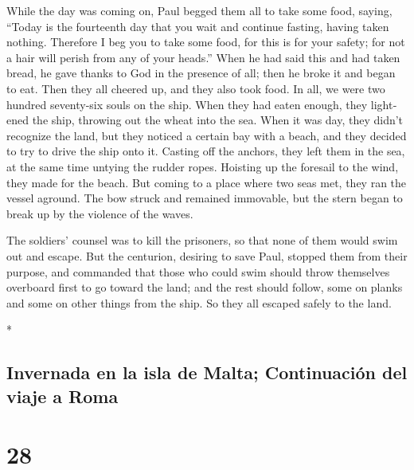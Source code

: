 \begin{paracol}{2}
\begin{otherlanguage}{english}
 While the day was coming on, Paul begged them all to
take some food, saying, ``Today is the fourteenth day that you wait and
continue fasting, having taken nothing.  Therefore I beg
you to take some food, for this is for your safety; for not a hair will
perish from any of your heads.''  When he had said this
and had taken bread, he gave thanks to God in the presence of all; then
he broke it and began to eat.  Then they all cheered up,
and they also took food.  In all, we were two hundred
seventy-six souls on the ship.  When they had eaten
enough, they lightened the ship, throwing out the wheat into the sea.
 When it was day, they didn't recognize the land, but
they noticed a certain bay with a beach, and they decided to try to
drive the ship onto it.  Casting off the anchors, they
left them in the sea, at the same time untying the rudder ropes.
Hoisting up the foresail to the wind, they made for the beach.
 But coming to a place where two seas met, they ran the
vessel aground. The bow struck and remained immovable, but the stern
began to break up by the violence of the waves.

 The soldiers' counsel was to kill the prisoners, so that
none of them would swim out and escape.  But the
centurion, desiring to save Paul, stopped them from their purpose, and
commanded that those who could swim should throw themselves overboard
first to go toward the land;  and the rest should follow,
some on planks and some on other things from the ship. So they all
escaped safely to the land.

\end{otherlanguage}

\switchcolumn[0]*

\hypertarget{invernada-en-la-isla-de-malta-continuaciuxf3n-del-viaje-a-roma}{%
\subsection{Invernada en la isla de Malta; Continuación del viaje a
Roma}\label{invernada-en-la-isla-de-malta-continuaciuxf3n-del-viaje-a-roma}}

\hypertarget{section-54}{%
\section{28}\label{section-54}}


\end{paracol}
